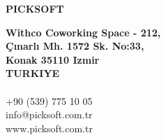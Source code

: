 \thispagestyle{empty} %
\vspace*{\fill}
\sffamily

\Large{
\noindent
\textbf{PICKSOFT}\\
}

\small
\noindent
\textbf{Withco Coworking Space - 212,}\\
\textbf{Çınarlı Mh. 1572 Sk. No:33,}\\
\textbf{Konak 35110 Izmir}\\
\textbf{TURKIYE}\\
\\
+90 (539) 775 10 05\\
info@picksoft.com.tr\\
www.picksoft.com.tr\\
\normalsize
\normalfont
\vspace*{2.5cm}
